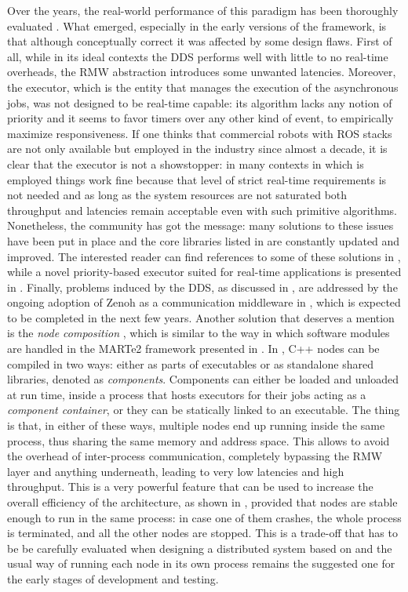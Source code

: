 Over the years, the real-world performance of this paradigm has been thoroughly evaluated \cite{bedard_message_2023,maruyama_exploring_2016,puck_distributed_2020,kronauer_latency_2021}. What emerged, especially in the early versions of the framework, is that although conceptually correct it was affected by some design flaws. First of all, while in its ideal contexts the DDS performs well with little to no real-time overheads, the RMW abstraction introduces some unwanted latencies. Moreover, the \ROS executor, which is the entity that manages the execution of the asynchronous jobs, was not designed to be real-time capable: its algorithm lacks any notion of priority and it seems to favor timers over any other kind of event, to empirically maximize responsiveness. If one thinks that commercial robots with ROS stacks are not only available but employed in the industry since almost a decade, it is clear that the \ROS executor is not a showstopper: in many contexts in which \ROS is employed things work fine because that level of strict real-time requirements is not needed and as long as the system resources are not saturated both throughput and latencies remain acceptable even with such primitive algorithms. Nonetheless, the community has got the message: many solutions to these issues have been put in place and the core \ROS libraries listed in  are constantly updated and improved. The interested reader can find references to some of these solutions in \cite{bedard_message_2023}, while a novel priority-based executor suited for real-time applications is presented in \cite{staschulat_rclc_2020}. Finally, problems induced by the DDS, as discussed in , are addressed by the ongoing adoption of Zenoh as a communication middleware in \ROS \cite{open_robotics_ros_2023}, which is expected to be completed in the next few years. Another solution that deserves a mention is the \emph{node composition} \cite{macenski_impact_2023}, which is similar to the way in which software modules are handled in the MARTe2 framework presented in . In \ROS, C++ nodes can be compiled in two ways: either as parts of executables or as standalone shared libraries, denoted as \emph{components}. Components can either be loaded and unloaded at run time, inside a process that hosts executors for their jobs acting as a \emph{component container}, or they can be statically linked to an executable. The thing is that, in either of these ways, multiple nodes end up running inside the same process, thus sharing the same memory and address space. This allows to avoid the overhead of inter-process communication, completely bypassing the RMW layer and anything underneath, leading to very low latencies and high throughput. This is a very powerful feature that can be used to increase the overall efficiency of the architecture, as shown in \cite{macenski_impact_2023}, provided that nodes are stable enough to run in the same process: in case one of them crashes, the whole process is terminated, and all the other nodes are stopped. This is a trade-off that has to be be carefully evaluated when designing a distributed system based on \ROS and the usual way of running each node in its own process remains the suggested one for the early stages of development and testing.

